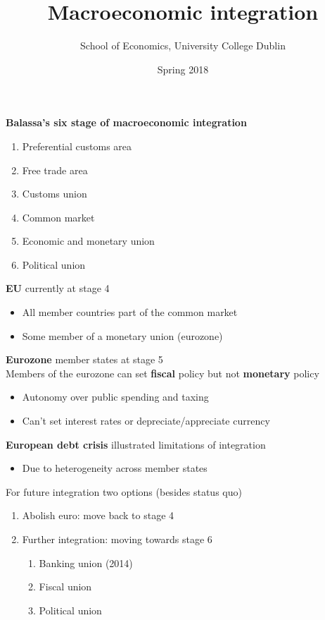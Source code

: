 \documentclass{beamer}
\title{Macroeconomic integration}
\author{School of Economics, University College Dublin}
\date{Spring 2018}
\begin{document}
\begin{frame}
 \titlepage
\end{frame}

\begin{frame}
  \textbf{Balassa's six stage of macroeconomic integration}
  \begin{enumerate}
    \item Preferential customs area
    \item Free trade area
    \item Customs union
    \item Common market
    \item Economic and monetary union
    \item Political union
  \end{enumerate}
\end{frame}

\begin{frame}
  \textbf{EU} currently at stage 4
  \begin{itemize}
    \item All member countries part of the common market
    \item Some member of a monetary union (eurozone)
  \end{itemize}
  \medskip
 \textbf{Eurozone} member states at stage 5\\
  \medskip
  Members of the eurozone can set \textbf{fiscal} policy but not \textbf{monetary} policy
  \begin{itemize}
    \item Autonomy over public spending and taxing
    \item Can't set interest rates or depreciate/appreciate currency
  \end{itemize}
\end{frame}

\begin{frame}
  \textbf{European debt crisis} illustrated limitations of integration
  \begin{itemize}
    \item Due to heterogeneity across member states
  \end{itemize}
  \medskip
  For future integration two options (besides status quo)
  \begin{enumerate}
    \item Abolish euro: move back to stage 4
    \item Further integration: moving towards stage 6
    \begin{enumerate}[i]
      \item Banking union (2014)
      \item Fiscal union
      \item Political union
    \end{enumerate}    
  \end{enumerate}  
\end{frame}
\end{document}
